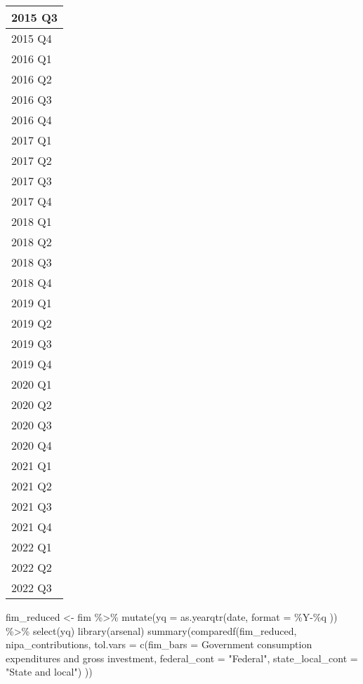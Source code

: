 \documentclass[
]{article}
\newenvironment{Shaded}{\begin{snugshade}}{\end{snugshade}}
\newcommand{\AttributeTok}[1]{\textcolor[rgb]{0.77,0.63,0.00}{#1}}
\newcommand{\FunctionTok}[1]{\textcolor[rgb]{0.00,0.00,0.00}{#1}}
\newcommand{\NormalTok}[1]{#1}
\newcommand{\OtherTok}[1]{\textcolor[rgb]{0.56,0.35,0.01}{#1}}
\newcommand{\SpecialCharTok}[1]{\textcolor[rgb]{0.00,0.00,0.00}{#1}}
\newcommand{\StringTok}[1]{\textcolor[rgb]{0.31,0.60,0.02}{#1}}
\begin{document}
\begin{tabular}{l}
\hline
2015 Q3\\
\hline
2015 Q4\\
\hline
2016 Q1\\
\hline
2016 Q2\\
\hline
2016 Q3\\
\hline
2016 Q4\\
\hline
2017 Q1\\
\hline
2017 Q2\\
\hline
2017 Q3\\
\hline
2017 Q4\\
\hline
2018 Q1\\
\hline
2018 Q2\\
\hline
2018 Q3\\
\hline
2018 Q4\\
\hline
2019 Q1\\
\hline
2019 Q2\\
\hline
2019 Q3\\
\hline
2019 Q4\\
\hline
2020 Q1\\
\hline
2020 Q2\\
\hline
2020 Q3\\
\hline
2020 Q4\\
\hline
2021 Q1\\
\hline
2021 Q2\\
\hline
2021 Q3\\
\hline
2021 Q4\\
\hline
2022 Q1\\
\hline
2022 Q2\\
\hline
2022 Q3\\
\hline
\end{tabular}

\begin{Shaded}
\begin{Highlighting}[]
\NormalTok{fim\_reduced }\OtherTok{\textless{}{-}}
\NormalTok{  fim }\SpecialCharTok{\%\textgreater{}\%}
  \FunctionTok{mutate}\NormalTok{(}\AttributeTok{yq =} \FunctionTok{as.yearqtr}\NormalTok{(date, }\AttributeTok{format =} \StringTok{\textquotesingle{}\%Y{-}\%q\textquotesingle{}}\NormalTok{ )) }\SpecialCharTok{\%\textgreater{}\%}
  \FunctionTok{select}\NormalTok{(yq)}
\FunctionTok{library}\NormalTok{(}\StringTok{\textquotesingle{}arsenal\textquotesingle{}}\NormalTok{)}
\FunctionTok{summary}\NormalTok{(}\FunctionTok{comparedf}\NormalTok{(fim\_reduced, nipa\_contributions,}
                \AttributeTok{tol.vars =} \FunctionTok{c}\NormalTok{(}\AttributeTok{fim\_bars =} \StringTok{\textquotesingle{}Government consumption expenditures and gross investment\textquotesingle{}}\NormalTok{,}
                             \AttributeTok{federal\_cont =} \StringTok{"Federal"}\NormalTok{, }
                             \AttributeTok{state\_local\_cont =} \StringTok{"State and local"}\NormalTok{)}
\NormalTok{))}
\end{Highlighting}
\end{Shaded}
\end{document}
